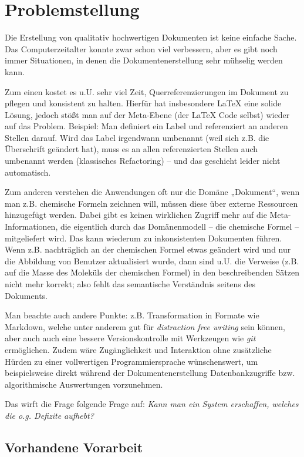 \section{Problemstellung}

Die Erstellung von qualitativ hochwertigen Dokumenten ist keine einfache Sache.
Das Computerzeitalter konnte zwar schon viel verbessern, aber es gibt noch
immer Situationen, in denen die Dokumentenerstellung sehr mühselig werden kann.

Zum einen kostet es u.U. sehr viel Zeit, Querreferenzierungen im Dokument zu
pflegen und konsistent zu halten.
Hierfür hat insbesondere LaTeX eine solide Lösung, jedoch stößt man auf der Meta-Ebene
(der LaTeX Code selbst) wieder auf das Problem. Beispiel: Man definiert ein
Label und referenziert an anderen Stellen darauf. Wird das Label irgendwann umbenannt
(weil sich z.B. die Überschrift geändert hat), muss es an allen referenzierten
Stellen auch umbenannt werden (klassisches Refactoring) -- und das geschieht
leider nicht automatisch.

Zum anderen verstehen die Anwendungen oft nur die Domäne „Dokument“,
wenn man z.B. chemische Formeln zeichnen will, müssen diese über externe
Ressourcen hinzugefügt werden. Dabei gibt es keinen wirklichen Zugriff
mehr auf die Meta-Informationen, die eigentlich durch das Domänenmodell
-- die chemische Formel -- mitgeliefert wird. Das kann wiederum zu inkonsistenten
Dokumenten führen. Wenn z.B. nachträglich an der chemischen Formel etwas
geändert wird und nur die Abbildung von Benutzer aktualisiert wurde,
dann sind u.U. die Verweise
(z.B. auf die Masse des Moleküls der chemischen Formel)
in den beschreibenden Sätzen nicht mehr korrekt;
also fehlt das semantische Verständnis seitens des Dokuments.

Man beachte auch andere Punkte: z.B. Transformation in Formate wie Markdown,
welche unter anderem gut für \emph{distraction free writing} sein können,
aber auch auch eine bessere Versionskontrolle
mit Werkzeugen wie \emph{git} ermöglichen.
Zudem wäre Zugänglichkeit und Interaktion ohne zusätzliche Hürden zu einer
vollwertigen Programmiersprache wünschenswert, um beispielsweise
direkt während der Dokumentenerstellung Datenbankzugriffe bzw.
algorithmische Auswertungen vorzunehmen.

Das wirft die Frage folgende Frage auf:
\emph{Kann man ein System erschaffen,
welches die o.g. Defizite aufhebt?}

\subsection{Vorhandene Vorarbeit}

